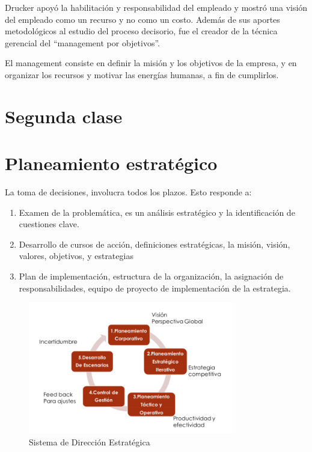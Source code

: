 \documentclass[titlepage,a4paper]{article}
\begin{document}
Drucker apoyó la habilitación y responsabilidad del empleado y mostró una visión del empleado como un recurso y no como un costo. Además de sus aportes metodológicos al estudio del proceso decisorio, fue el creador de la técnica gerencial del “management por objetivos”. 

El management consiste en definir la misión y los objetivos de la empresa, y en organizar los recursos y motivar las energías humanas, a fin de cumplirlos.




\section*{Segunda clase}
\section{Planeamiento estratégico}
La toma de decisiones, involucra todos los plazos. Esto responde a:
\begin{enumerate}
    \item Examen de la problemática, es un análisis estratégico y la identificación de cuestiones clave.
    \item Desarrollo de cursos de acción, definiciones estratégicas, la misión, visión, valores, objetivos, y estrategias
    \item Plan de implementación, estructura de la organización, la asignación de responsabilidades, equipo de proyecto de implementación de la estrategia.
\end{enumerate}

\begin{figure}[!htb]
    \centering
    \includegraphics[width=0.8\textwidth]{imagenes/DireccionEstrategica.PNG}
    \caption{Sistema de Dirección Estratégica}
\end{figure}
\end{document}
